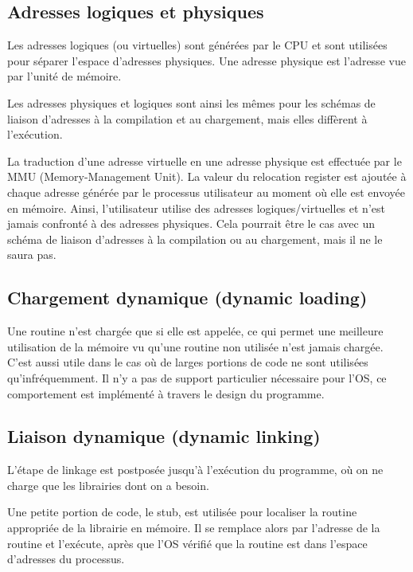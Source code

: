 
	\subsection{Adresses logiques et physiques}
	
	Les adresses logiques (ou virtuelles) sont générées par le CPU et sont utilisées pour séparer l'espace d'adresses physiques. Une adresse physique est l'adresse vue par l'unité de mémoire.
	
	Les adresses physiques et logiques sont ainsi les mêmes pour les schémas de liaison d'adresses à la compilation et au chargement, mais elles diffèrent à l'exécution.
	
	La traduction d'une adresse virtuelle en une adresse physique est effectuée par le MMU (Memory-Management Unit). La valeur du relocation register est ajoutée à chaque adresse générée par le processus utilisateur au moment où elle est envoyée en mémoire. Ainsi, l'utilisateur utilise des adresses logiques/virtuelles et n'est jamais confronté à des adresses physiques. Cela pourrait être le cas avec un schéma de liaison d'adresses à la compilation ou au chargement, mais il ne le saura pas.
	
	
	\subsection{Chargement dynamique (dynamic loading)}
	
	Une routine n'est chargée que si elle est appelée, ce qui permet une meilleure utilisation de la mémoire vu qu'une routine non utilisée n'est jamais chargée. C'est aussi utile dans le cas où de larges portions de code ne sont utilisées qu'infréquemment. Il n'y a pas de support particulier nécessaire pour l'OS, ce comportement est implémenté à travers le design du programme.
	
	\subsection{Liaison dynamique (dynamic linking)}
	
	L'étape de linkage est postposée jusqu'à l'exécution du programme, où on ne charge que les librairies dont on a besoin.
	
	Une petite portion de code, le stub, est utilisée pour localiser la routine appropriée de la librairie en mémoire. Il se remplace alors par l'adresse de la routine et l'exécute, après que l'OS vérifié que la routine est dans l'espace d'adresses du processus.
	
